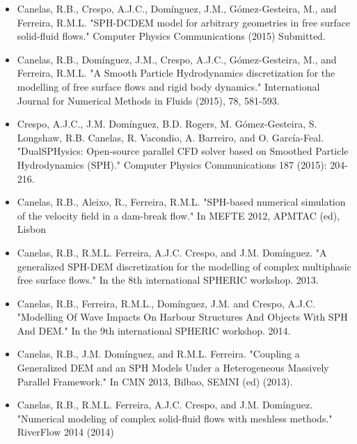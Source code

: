 \begin{itemize}
\item Canelas, R.B., Crespo, A.J.C., Dom\'{i}nguez, J.M., G\'{o}mez-Gesteira, M., and Ferreira, R.M.L. "SPH-DCDEM model for arbitrary geometries in free surface solid-fluid flows." Computer Physics Communications (2015) Submitted.
\item Canelas, R.B., Dom\'{i}nguez, J.M., Crespo, A.J.C., G\'{o}mez-Gesteira, M., and Ferreira, R.M.L. "A Smooth Particle Hydrodynamics discretization for the modelling of free surface flows and rigid body dynamics." International Journal for Numerical Methods in Fluids (2015), 78, 581-593.
\item  Crespo, A.J.C., J.M. Dom\'{i}nguez, B.D. Rogers, M. G\'{o}mez-Gesteira, S. Longshaw, R.B. Canelas, R. Vacondio, A. Barreiro, and O. Garc\'{i}a-Feal. "DualSPHysics: Open-source parallel CFD solver based on Smoothed Particle Hydrodynamics (SPH)." Computer Physics Communications 187 (2015): 204-216.
\item Canelas, R.B., Aleixo, R., Ferreira, R.M.L. "SPH-based numerical simulation of the velocity field in a dam-break flow." In MEFTE 2012, APMTAC (ed), Lisbon
\item Canelas, R.B., R.M.L. Ferreira, A.J.C. Crespo, and J.M. Dom\'{i}nguez. "A generalized SPH-DEM discretization for the modelling of complex multiphasic free surface flows." In the 8th international SPHERIC workshop. 2013.
\item Canelas, R.B., Ferreira, R.M.L., Dom\'{i}nguez, J.M. and Crespo, A.J.C. "Modelling Of Wave Impacts On Harbour Structures And Objects With SPH And DEM." In the 9th international SPHERIC workshop. 2014.
\item Canelas, R.B., J.M. Dom\'{i}nguez, and R.M.L. Ferreira. "Coupling a Generalized DEM and an SPH Models Under a Heterogeneous Massively Parallel Framework." In CMN 2013, Bilbao, SEMNI (ed) (2013).
\item  Canelas, R.B., R.M.L. Ferreira, A.J.C. Crespo, and J.M. Dom\'{i}nguez. "Numerical modeling of complex solid-fluid flows with meshless methods." RiverFlow 2014 (2014)
\end{itemize}

